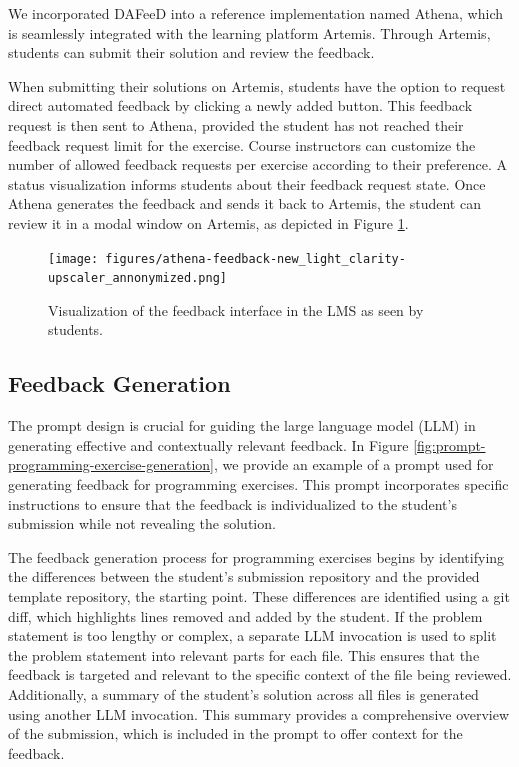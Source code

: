 \documentclass[manuscript,screen,review]{acmart}
\begin{document}
We incorporated DAFeeD into a reference implementation named Athena, which is seamlessly integrated with the learning platform Artemis. 
Through Artemis, students can submit their solution and review the feedback.

When submitting their solutions on Artemis, students have the option to request direct automated feedback by clicking a newly added button.
This feedback request is then sent to Athena, provided the student has not reached their feedback request limit for the exercise.
Course instructors can customize the number of allowed feedback requests per exercise according to their preference.
A status visualization informs students about their feedback request state.
Once Athena generates the feedback and sends it back to Artemis, the student can review it in a modal window on Artemis, as depicted in Figure \ref{fig:Artemis-feedback-visualization}.

\begin{figure}[htbp]
  \centering
  \texttt{[image: figures/athena-feedback-new\_light\_clarity-upscaler\_annonymized.png]}
  \caption{Visualization of the feedback interface in the LMS as seen by students.}
  \label{fig:Artemis-feedback-visualization}
\end{figure}


\subsection{Feedback Generation}

The prompt design is crucial for guiding the large language model (LLM) in generating effective and contextually relevant feedback. 
In Figure \ref{fig:prompt-programming-exercise-generation}, we provide an example of a prompt used for generating feedback for programming exercises. 
This prompt incorporates specific instructions to ensure that the feedback is individualized to the student's submission while not revealing the solution.

The feedback generation process for programming exercises begins by identifying the differences between the student's submission repository and the provided template repository, the starting point. 
These differences are identified using a git diff, which highlights lines removed and added by the student. 
If the problem statement is too lengthy or complex, a separate LLM invocation is used to split the problem statement into relevant parts for each file. 
This ensures that the feedback is targeted and relevant to the specific context of the file being reviewed. 
Additionally, a summary of the student's solution across all files is generated using another LLM invocation. 
This summary provides a comprehensive overview of the submission, which is included in the prompt to offer context for the feedback.
\end{document}
